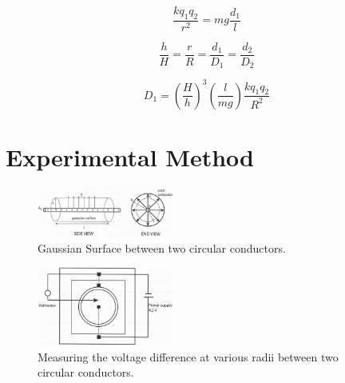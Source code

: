 \documentclass[letterpaper]{article}
\begin{document}
  \begin{equation}
    \frac{k q_1 q_2}{r^2}=mg\frac{d_1}{l}
  \end{equation}

  \begin{equation}
    \frac{h}{H}=\frac{r}{R}=\frac{d_1}{D_1}=\frac{d_2}{D_2}
  \end{equation}

  \begin{equation}
    D_1=(\frac{H}{h})^3 (\frac{l}{mg}) \frac{k q_1 q_2}{R^2}
  \end{equation}

\section{Experimental Method}

\begin{figure}[h!]
    \centering
    \includegraphics[width=0.4\textwidth]{fig1.jpg}
    \caption{Gaussian Surface between two circular conductors. \cite{labmanual}}
\end{figure}

\begin{figure}[h!]
    \centering
    \includegraphics[width=0.4\textwidth]{fig2.jpg}
    \caption{Measuring the voltage difference at various radii between two circular conductors. \cite{labmanual}}
\end{figure}
\end{document}
